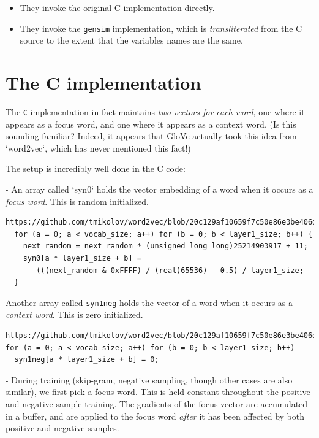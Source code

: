 \documentclass[11pt]{book}
\begin{document}
\begin{itemize}
\item They invoke the original C implementation directly.
\item They invoke the \texttt{gensim} implementation, which is
\emph{transliterated} from the C source to the extent that the variables names
are the same.
\end{itemize}

\section{The C implementation}

The \texttt{C} implementation in fact maintains \emph{two vectors for each word}, one where
it appears as a focus word, and one where it appears as a context word.
(Is this sounding familiar? Indeed, it appears that GloVe actually took this
idea from `word2vec`, which has never mentioned this fact!)

The setup is incredibly well done in the C code:

- An array called `syn0` holds the vector embedding of a word when it occurs
  as a \emph{focus word}. This is random initialized.

\begin{verbatim}
https://github.com/tmikolov/word2vec/blob/20c129af10659f7c50e86e3be406df663beff438/word2vec.c#L369
  for (a = 0; a < vocab_size; a++) for (b = 0; b < layer1_size; b++) {
    next_random = next_random * (unsigned long long)25214903917 + 11;
    syn0[a * layer1_size + b] =
       (((next_random & 0xFFFF) / (real)65536) - 0.5) / layer1_size;
  }
\end{verbatim}

Another array called \texttt{syn1neg} holds the vector of a word when it occurs
as a \emph{context word}. This is zero initialized.

\begin{verbatim}
https://github.com/tmikolov/word2vec/blob/20c129af10659f7c50e86e3be406df663beff438/word2vec.c#L365
for (a = 0; a < vocab_size; a++) for (b = 0; b < layer1_size; b++)
  syn1neg[a * layer1_size + b] = 0;
\end{verbatim}

- During training (skip-gram, negative sampling, though other cases are
  also similar), we first pick a focus word. This is held constant throughout
  the positive and negative sample training. The gradients of the focus vector
  are accumulated in a buffer, and are applied to the focus word
  \emph{after} it has been affected by both positive and negative samples.
\end{document}
